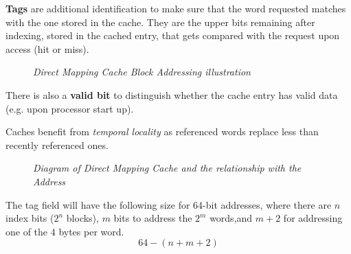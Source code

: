 \documentclass[11pt]{article}
\begin{document}
\textbf{Tags} are additional identification to make sure that the word requested matches with the one stored in the cache. They are the upper bits remaining after indexing, stored in the cached entry, that gets compared with the request upon access (hit or miss).

\begin{figure}[htbp]
    \centering
    \caption{\textit{Direct Mapping Cache Block Addressing illustration}}
\end{figure}

There is also a \textbf{valid bit} to distinguish whether the cache entry has valid data (e.g. upon processor start up).

Caches benefit from \textit{temporal locality} as referenced words replace less than recently referenced ones.

\begin{figure}[htbp]
    \centering
    \caption{\textit{Diagram of Direct Mapping Cache and the relationship with the Address}}
\end{figure}

\pagebreak
The tag field will have the following size for 64-bit addresses, where there are $n$ index bits ($2^n$ blocks), $m$ bits to address the $2^{m}$ words,and $m+2$ for addressing one of the 4 bytes per word.
\vspace{-1em}
$$64-(n+m+2)$$
\end{document}
